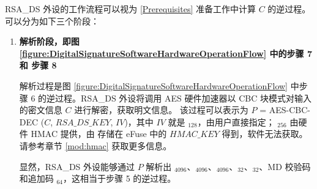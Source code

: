 \documentclass[main\_\_CN.tex]{subfiles}
\begin{document}
RSA\_DS 外设的工作流程可以视为 \ref{Prerequisites} 准备工作中计算 \begin{math}C\end{math} 的逆过程。可以分为如下三个阶段：

\begin{enumerate}

    \item {\bfseries 解析阶段，即图 \ref{figure:DigitalSignatureSoftwareHardwareOperationFlow} 中的步骤 7 和 步骤 8}

        解析过程是图 \ref{figure:DigitalSignatureSoftwareHardwareOperationFlow} 中步骤 6 的逆过程。RSA\_DS 外设将调用 AES 硬件加速器以 CBC 块模式对输入的密文信息 \begin{math}C\end{math} 进行解密，获取明文信息。
        该过程可以表示为
        \begin{math}P\end{math} = AES-CBC-DEC (\begin{math}C\end{math}, \begin{math}RSA\_DS\_KEY\end{math}, \begin{math}IV\end{math})，其中 \begin{math}IV\end{math} 就是 \begin{math}[IV]_{128}\end{math}，由用户直接指定； \begin{math}[RSA\_DS\_KEY]_{256}\end{math} 由硬件 HMAC 提供，由 存储在 eFuse 中的 \begin{math}HMAC\_KEY\end{math} 得到，软件无法获取。请参考章节 \ref{mod:hmac} \textit{} 获取更多信息。

        显然，RSA\_DS 外设能够通过 \begin{math}P\end{math} 解析出 \begin{math}[Y]_{4096}\end{math}、\begin{math}[M]_{4096}\end{math}、\begin{math}[\overline{r}]_{4096}\end{math}、\begin{math}[M^{\prime}]_{32}\end{math}、\begin{math}[L]_{32}\end{math}、MD 校验码和追加码 \begin{math}[\beta]_{64} \end{math}，这相当于步骤 5 的逆过程。


\end{enumerate}
\end{document}

